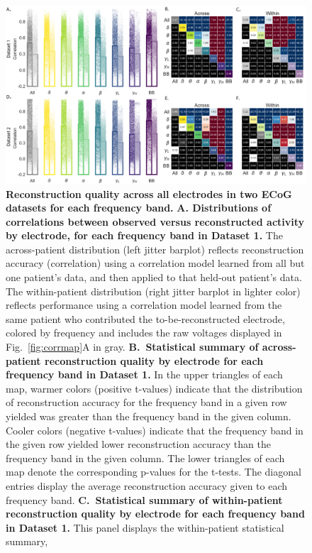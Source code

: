 \documentclass[11pt]{article}
\begin{document}
\begin{figure}
  \centering
  \includegraphics[width=\textwidth]{figs/frequency}
  \caption{\textbf{Reconstruction quality across all electrodes in two
      ECoG datasets for each frequency band.} \textbf{A. Distributions of correlations
      between observed versus reconstructed activity by electrode, for
      each frequency band in Dataset 1.}  The across-patient
    distribution (left jitter barplot) reflects
    reconstruction accuracy (correlation) using a correlation model
    learned from all but one patient's data, and then applied to that
    held-out patient's data.  The within-patient distribution (right
    jitter barplot in lighter color)
    reflects performance using a correlation model learned from the same
    patient who contributed the to-be-reconstructed electrode, colored
    by frequency and includes the raw voltages displayed in
    Fig.~\ref{fig:corrmap}A in gray.
    \textbf{B.~Statistical summary of across-patient reconstruction
      quality by electrode for each frequency band in Dataset 1.} In the upper triangles of each
    map, warmer colors (positive t-values) indicate that the
    distribution of
    reconstruction accuracy for the frequency band in a given row
    yielded was greater than the frequency band in the given
    column. Cooler colors (negative t-values) indicate that the
    frequency band in the given row yielded lower reconstruction
    accuracy than the frequency band in the given column. The lower
    triangles of each map denote the corresponding p-values for the
    t-tests. The diagonal entries display the average
    reconstruction accuracy given to each frequency
    band. \textbf{C.~Statistical summary of within-patient reconstruction
      quality by electrode for each frequency band in Dataset 1.}
    This panel displays the within-patient statistical summary,
}
\end{figure}
\end{document}
